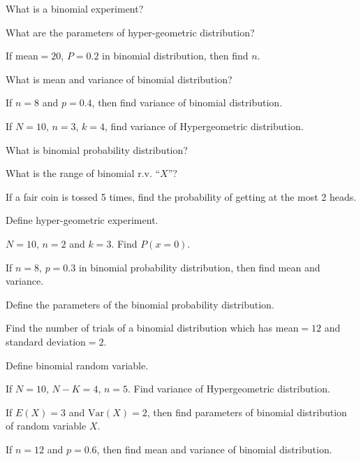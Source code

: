 \documentclass[11pt,a4paper]{article}
\begin{document}
\begin{shortlist}
\item What is a binomial experiment?

\item What are the parameters of hyper-geometric distribution?

\item If mean$=20$, $P=0.2$ in binomial distribution, then find $n$.

\item What is mean and variance of binomial distribution?

\item If $n=8$ and $p=0.4$, then find variance of binomial distribution.

\item If $N=10$, $n=3$, $k=4$, find variance of Hypergeometric distribution.

\item What is binomial probability distribution?

\item What is the range of binomial r.v. ``$X$''?

\item If a fair coin is tossed 5 times, find the probability of getting at the most 2 heads.

\item Define hyper-geometric experiment.

\item $N=10$, $n=2$ and $k=3$. Find $P(x=0)$.

\item If $n=8$, $p=0.3$ in binomial probability distribution, then find mean and variance.

\item Define the parameters of the binomial probability distribution.

\item Find the number of trials of a binomial distribution which has mean$=12$ and standard deviation$=2$.

\item Define binomial random variable.

\item If $N=10$, $N-K=4$, $n=5$. Find variance of Hypergeometric distribution.

\item If $E(X)=3$ and $\mathrm{Var}(X)=2$, then find parameters of binomial distribution of random variable $X$.

\item If $n=12$ and $p=0.6$, then find mean and variance of binomial distribution.


\end{shortlist}
\end{document}
